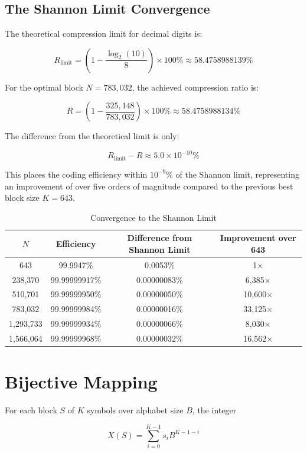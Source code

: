 \documentclass[10pt, onecolumn]{IEEEtran}
\begin{document}
\subsection{The Shannon Limit Convergence}

The theoretical compression limit for decimal digits is:

\[
R_{\text{limit}} = \left(1 - \frac{\log_2(10)}{8}\right) \times 100\% \approx 58.4758988139\%
\]

For the optimal block $N=783,032$, the achieved compression ratio is:

\[
R = \left(1 - \frac{325,148}{783,032}\right) \times 100\% \approx 58.4758988134\%
\]

The difference from the theoretical limit is only:

\[
R_{\text{limit}} - R \approx 5.0 \times 10^{-10}\%
\]

This places the coding efficiency within $10^{-9}\%$ of the Shannon limit, representing an improvement of over five orders of magnitude compared to the previous best block size $K=643$.

\begin{table}[ht]
\centering
\caption{Convergence to the Shannon Limit}
\label{tab:shannon_convergence}
\begin{tabular}{cccc}
\toprule
$N$ & Efficiency & Difference from Shannon Limit & Improvement over 643 \\
\midrule
643 & 99.9947\% & 0.0053\% & 1$\times$ \\
238,370 & 99.99999917\% & 0.00000083\% & 6,385$\times$ \\
510,701 & 99.99999950\% & 0.00000050\% & 10,600$\times$ \\
783,032 & 99.99999984\% & 0.00000016\% & 33,125$\times$ \\
1,293,733 & 99.99999934\% & 0.00000066\% & 8,030$\times$ \\
1,566,064 & 99.99999968\% & 0.00000032\% & 16,562$\times$ \\
\bottomrule
\end{tabular}
\end{table}

\section{Bijective Mapping}

For each block $S$ of $K$ symbols over alphabet size $B$, the integer

\[
X(S) = \sum_{i=0}^{K-1} s_i B^{K-1-i}
\]
\end{document}
